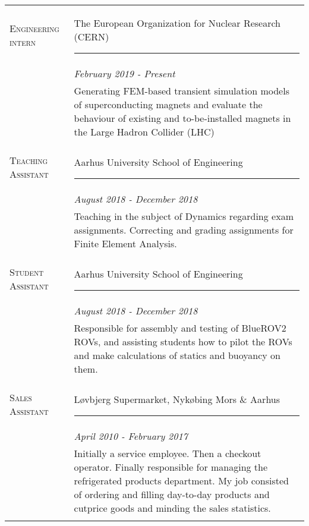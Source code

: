 \documentclass[letterpaper]{twentysecondcv} %
\begin{document}
\setlength{\tabcolsep}{.4em}
\begin{tabular}{p{2.9cm} | p{9.6cm}}
\textsc{Engineering intern} & The European Organization for Nuclear Research (CERN) \hrule \\&\emph{\small{February 2019 - Present }}\\ [0.5mm]
&\small{Generating FEM-based transient simulation models of superconducting magnets and evaluate the behaviour of existing and to-be-installed magnets in the Large Hadron Collider (LHC)} \\\multicolumn{2}{c}{} \\

\textsc{Teaching Assistant} & {Aarhus University School of Engineering \hrule} \\&\emph{\small{August 2018 - December 2018}}\\ [0.5mm]
&\small{Teaching in the subject of Dynamics regarding exam assignments.
Correcting and grading assignments for Finite Element Analysis.}\\\multicolumn{2}{c}{} \\

\textsc{Student Assistant} & {Aarhus University School of Engineering \hrule} \\&\emph{\small{August 2018 - December 2018}}\\ [0.5mm] 
&\small{Responsible for assembly and testing of BlueROV2 ROVs, and assisting
students how to pilot the ROVs and make calculations of statics and
buoyancy on them.}\\\multicolumn{2}{c}{} \\

\textsc{Sales Assistant} & {Løvbjerg Supermarket, Nykøbing Mors \& Aarhus \hrule} \\&\emph{\small{April 2010 - February 2017}}\\ [0.5mm]
&\small{
Initially a service employee. Then a checkout operator. Finally responsible for managing the refrigerated products department. My job consisted of ordering and filling day-to-day products and cutprice
goods and minding the sales statistics.
}\\\multicolumn{2}{c}{} \\


\end{tabular}
\end{document}
